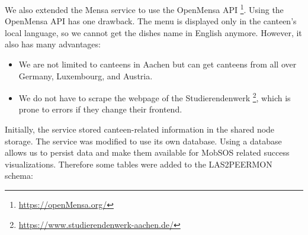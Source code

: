 We also extended the Mensa service to use the OpenMensa API \footnote{\url{https://openMensa.org/}}. 
Using the OpenMensa API has one drawback. The menu is displayed only in the canteen's local language, so we cannot get the dishes name in English anymore.
However, it also has many advantages:
\begin{itemize}
    \item We are not limited to canteens in Aachen but can get canteens from all over Germany, Luxembourg, and Austria. 
    \item We do not have to scrape the webpage of the Studierendenwerk \footnote{\url{https://www.studierendenwerk-aachen.de/}}, which is prone to errors if they change their frontend.
\end{itemize}
Initially, the service stored canteen-related information in the shared node storage. The service was modified to use its own database. Using a database allows us to persist data and make them available for MobSOS related success visualizations. 
Therefore some tables were added to the LAS2PEERMON schema:

